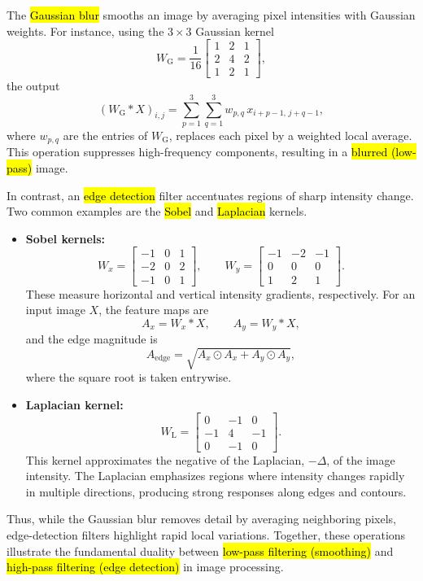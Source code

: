 \begin{example}
The \hl{Gaussian blur} smooths an image by averaging pixel intensities with Gaussian weights.
For instance, using the $3\times3$ Gaussian kernel
$$
W_{\text{G}} = \frac{1}{16}
\begin{bmatrix}
1 & 2 & 1\\
2 & 4 & 2\\
1 & 2 & 1
\end{bmatrix},
$$
the output
\[
(W_{\text{G}} * X)_{i,j}
= \sum_{p=1}^{3}\sum_{q=1}^{3} w_{p,q}\,x_{i+p-1,\,j+q-1},
\]
where $w_{p,q}$ are the entries of $W_{\text{G}}$, replaces each pixel by a weighted local average.  
This operation suppresses high-frequency components, resulting in a \hl{blurred (low-pass)} image.

\medskip
In contrast, an \hl{edge detection} filter accentuates regions of sharp intensity change.
Two common examples are the \hl{Sobel} and \hl{Laplacian} kernels.

\begin{itemize}
\item \textbf{Sobel kernels:}
\[
W_x =
\begin{bmatrix}
-1 & 0 & 1\\
-2 & 0 & 2\\
-1 & 0 & 1
\end{bmatrix},
\qquad
W_y =
\begin{bmatrix}
-1 & -2 & -1\\
0 & 0 & 0\\
1 & 2 & 1
\end{bmatrix}.
\]
These measure horizontal and vertical intensity gradients, respectively. For an input image $X$, the feature maps are
\[
A_x = W_x * X,
\qquad
A_y = W_y * X,
\]
and the edge magnitude is
\[
A_{\text{edge}} = \sqrt{A_x \odot A_x + A_y \odot A_y},
\]
where the square root is taken entrywise.

\item \textbf{Laplacian kernel:}
\[
W_{\text{L}} =
\begin{bmatrix}
0 & -1 & 0\\
-1 & 4 & -1\\
0 & -1 & 0
\end{bmatrix}.
\]
This kernel approximates the negative of the Laplacian, $-\Delta$, of the image intensity. The Laplacian emphasizes regions where intensity changes rapidly in multiple directions,
producing strong responses along edges and contours.
\end{itemize}

\medskip
Thus, while the Gaussian blur removes detail by averaging neighboring pixels,
edge-detection filters highlight rapid local variations.
Together, these operations illustrate the fundamental duality between
\hl{low-pass filtering (smoothing)} and \hl{high-pass filtering (edge detection)} in image processing.
\end{example}

